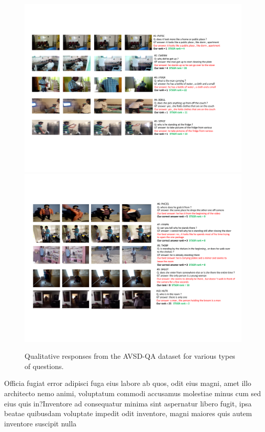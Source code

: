 \documentclass[letterpaper]{article}
\begin{document}
\begin{figure}
    \centering
    \includegraphics[width=18cm,trim={1cm 4.5cm 1.5cm 3cm},clip]{./figs/quals_results_suppl_3.pdf}
    \includegraphics[width=18cm,trim={1.5cm 4cm 1.5cm 3cm},clip]{./figs/quals_results_suppl_4.pdf}
    \caption{Qualitative responses from the AVSD-QA dataset for various types of questions.}
    \label{fig:avsd-qa-more-quals-x}
\end{figure}

Officia fugiat error adipisci fuga eius labore ab quos, odit eius magni, amet illo architecto nemo animi, voluptatum commodi accusamus molestiae minus cum sed eius quis in?Inventore ad consequatur minima sint aspernatur libero fugit, ipsa beatae quibusdam voluptate impedit odit inventore, magni maiores quis autem inventore suscipit nulla

\end{document}
